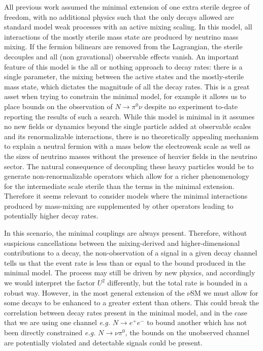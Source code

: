 \documentclass[11pt, a4paper]{article}
\begin{document}
All previous work assumed the minimal extension of one extra sterile degree of
freedom, with no additional physics such that the only decays allowed are
standard model weak processes with an active mixing scaling. 
%
In this model, all interactions of the mostly sterile mass state are produced
by neutrino mass mixing. If the fermion bilinears are removed from the
Lagrangian, the sterile decouples and all (non gravational) observable effects
vanish. An important feature of this model is the all or nothing approach to
decay rates: there is a single parameter, the mixing between the active states
and the mostly-sterile mass state, which dictates the magnitude of all the
decay rates. This is a great asset when trying to constrain the  minimal model,
for example it allows us to place bounds on the observation of $N\to \pi^0 \nu$
despite no experiment to-date reporting the results of such a search. 
%
While this model is minimal in it assumes no new fields or dynamics beyond the
single particle added at observable scales and its renormalizable interactions,
there is no theoretically appealing mechanism to explain a neutral fermion with
a mass below the electroweak scale as well as the sizes of neutrino masses
without the presence of heavier fields in the neutrino sector. The natural
consequence of decoupling these heavy particles would be to generate
non-renormalizable operators which allow for a richer phenomenology for the
intermediate scale sterile than the terms in the minimal extension. Therefore it 
seems relevant to consider models where the minimal interactions produced by 
mass-mixing are supplemented by other operators leading to potentially 
higher decay rates.

In this scenario, the minimal couplings are always present. Therefore, without
suspicious cancellations between the mixing-derived and higher-dimensional
contributions to a decay, the non-observation of a signal in a given decay
channel tells us that the event rate is less than or equal to the bound
produced in the minimal model. The process may still be driven by new physics,
and accordingly we would interpret the factor $U^2$ differently, but the total
rate is bounded in a robust way. However, in the most general extension of the
$\nu$SM we must allow for some decays to be enhanced to a greater extent than
others. This could break the correlation between decay rates present in the
minimal model, and in the case that we are using one channel \emph{e.g.} $N\to
e^+e^-$ to bound another which has not been directly constrained \emph{e.g.}
$N\to\nu\pi^0$, the bounds on the unobserved channel are potentially violated 
and detectable signals could be present.
\end{document}
